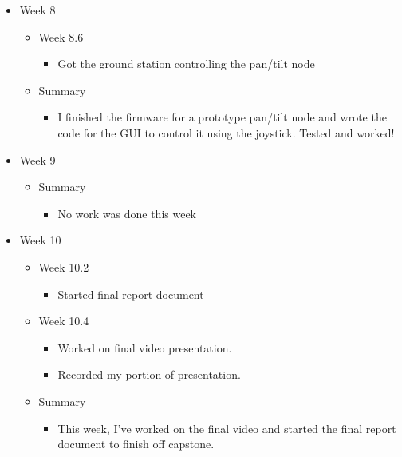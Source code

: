 \begin{itemize}
\item Week 8
	\begin{itemize}
	\item Week 8.6
      \begin{itemize}
      \item Got the ground station controlling the pan/tilt node
      \end{itemize}
    
    \item Summary
      \begin{itemize}
      \item I finished the firmware for a prototype pan/tilt node and wrote the code for the GUI to control it using the joystick. Tested and worked! 
      \end{itemize}
	\end{itemize}

\item Week 9
	\begin{itemize}
    \item Summary
      \begin{itemize}
      \item No work was done this week 
      \end{itemize}
	\end{itemize}

\item Week 10
	\begin{itemize}
	\item Week 10.2
      \begin{itemize}
      \item Started final report document 
      \end{itemize}
	\item Week 10.4
      \begin{itemize}
      \item Worked on final video presentation. 
      \item Recorded my portion of presentation. 
      \end{itemize}
    
    \item Summary
      \begin{itemize}
      \item This week, I've worked on the final video and started the final report document to finish off capstone. 
      \end{itemize}
	\end{itemize}

\end{itemize}